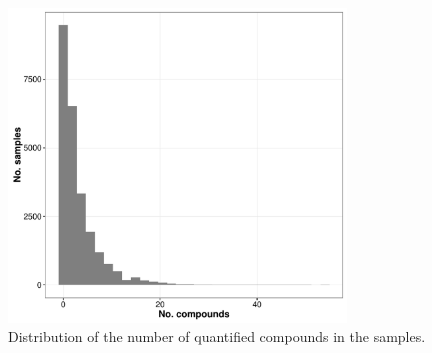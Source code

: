 \documentclass[pdftex,a4paper]{scrreprt}
\begin{document}
\begin{figure}[ht]
	\centering
	\includegraphics[width = 0.8\textwidth]{pmix}
	\caption{Distribution of the number of quantified compounds in the samples.}
	\label{fig:pmix}
\end{figure}


% 
\end{document}

